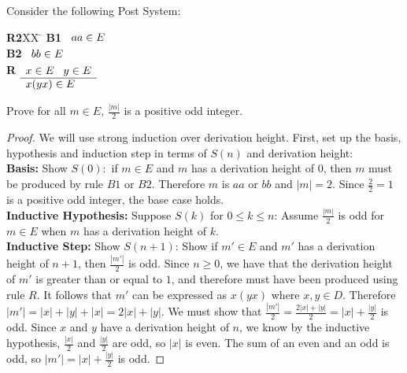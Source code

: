 \documentclass[]{exam}
\begin{document}
\begin{questions}
\question Consider the following Post System:
\begin{tabbing}
{\bf R2}XX \=  \kill
{\bf B1} \>
        \(\begin{array}[t]{l}
        aa \in E
        \end{array}\) \\[2ex]
{\bf B2} \>
        \(\begin{array}[t]{l}
        bb \in E
        \end{array}\) \\[2ex]
{\bf R} \>
        \(\begin{array}[t]{l}
        x \in E \;\;\;y \in E \\
        \hline
        x(yx) \in E
        \end{array}\) 
\end{tabbing}
Prove for all $m \in E$, $\frac{|m|}{2}$ is a positive odd integer.  
\begin{solution}
\begin{proof}
We will use strong induction over derivation height. First, set up the basis, 
hypothesis and induction step in terms of $S(n)$ and derivation height:
~\\
\textbf{Basis:} Show $S(0):$ if $m \in E$ and $m$ has a derivation height of
$0$, then $m$ must be produced by rule $B1$ or $B2$. Therefore $m$ is $aa$ or $bb$ 
and $|m| = 2$. Since $\frac{2}{2} = 1$ is a positive odd integer, the base
case holds.
~\\
\textbf{Inductive Hypothesis:} Suppose $S(k)$ for $0 \leq k \leq n$: 
Assume $\frac{|m|}{2}$ is odd
for $m \in E$ when $m$ has a derivation height of $k$.
~\\
\textbf{Inductive Step:} Show $S(n+1)$: Show if $m' \in E$ and $m'$ has a
derivation height of $n + 1$, then $\frac{|m'|}{2}$ is odd.  Since $n \geq 0$,
we have that the derivation height of $m'$ is greater than or equal to
$1$, and therefore must have been produced using rule $R$. It follows
that $m'$ can be expressed as $x(yx)$ where $x,y \in D$. Therefore $|m'| = |x| +
|y| + |x| = 2|x| + |y|$. We must show that $\frac{|m'|}{2} = \frac{2|x| + |y|}{2} = |x| +
\frac{|y|}{2}$ is odd.  Since $x$ and $y$ have a derivation height of $n$,
we know by the inductive hypothesis, $\frac{|x|}{2}$ 
and $\frac{|y|}{2}$ are odd, so $|x|$ is even. The sum of an even and
an odd is odd, so $|m'| = |x| + \frac{|y|}{2}$ is odd.
\end{proof}
\end{solution}
\end{questions}
\end{document}
